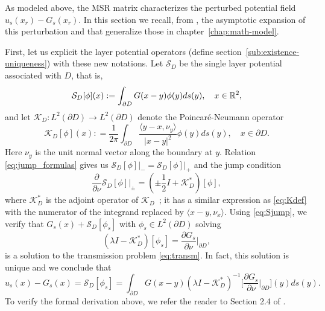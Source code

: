 As modeled above, the MSR matrix characterizes the perturbed
potential field $u_s(x_r) - G_s(x_r)$. In this section we
recall, from \cite{ammari2004reconstruction},  the asymptotic expansion of this
perturbation and that generalize those in chapter~\ref{chap:math-model}.

First, let us explicit the layer potential operators (define 
section~\ref{sub:existence-uniqueness}) with these new notations.
Let $\mathcal{S}_D$ be the single layer potential associated with
$D$, that is,
\begin{equation}
\mathcal{S}_D[\phi](x) :  = \int_{\partial D} G(x-y) \phi(y)
ds(y), \quad x \in \R^2,
\end{equation}
and let $\mathcal{K}_D: L^2(\partial D) \to L^2(\partial D)$
denote the Poincar\'e-Neumann operator
\begin{equation}
\mathcal{K}_D[\phi] (x) : = \frac{1}{2 \pi} \int_{\partial D}
\frac{\langle y - x, \nu_y\rangle}{|x-y|^2} \phi(y) ds(y), \quad x
\in \partial D. \label{eq:Kdef}
\end{equation}
Here $\nu_y$ is the unit normal vector along the boundary at $y$. Relation
\ref{eq:jump_formulas} gives us $\mathcal{S}_D[\phi]\big|_- =
\mathcal{S}_D[\phi]\big|_+$ and the jump condition
\begin{equation}
\frac{\partial}{\partial \nu} \mathcal{S}_D[\phi] \Big|_{\pm} =
\left( \pm \frac{1}{2} I + \mathcal{K}_D^*  \right)[\phi],
\label{eq:Sjump}
\end{equation}
where $\mathcal{K}_D^*$ is the adjoint operator of $\mathcal{K}_D$~;
it has a similar expression as \eqref{eq:Kdef} with the
numerator of the integrand replaced by $\langle x - y,
\nu_x\rangle$. Using \eqref{eq:Sjump}, we verify that $G_s(x)
+ \mathcal{S}_D[\phi_s]$ with $\phi_s \in L^2(\partial D)$ solving
\begin{equation}
\left( \lambda I - \mathcal{K}_D^* \right)[\phi_s] =
\frac{\partial G_s}{\partial \nu} \Big|_{\partial D},
\end{equation}
is a solution to the transmission problem \eqref{eq:transm}. In
fact, this solution is unique and we conclude that
\begin{equation}
u_s(x) - G_s(x) = \mathcal{S}_D[\phi_s] = \int_{\partial D}
G(x - y) (\lambda I - \mathcal{K}_D^*)^{-1}
\bigg[\frac{\partial G_s}{\partial \nu}\Big|_{\partial D}
\bigg](y)  ds(y). \label{eq:dfield}
\end{equation}
To verify the formal derivation above, we refer the reader to
Section 2.4 of \cite{ammari2004reconstruction}.

